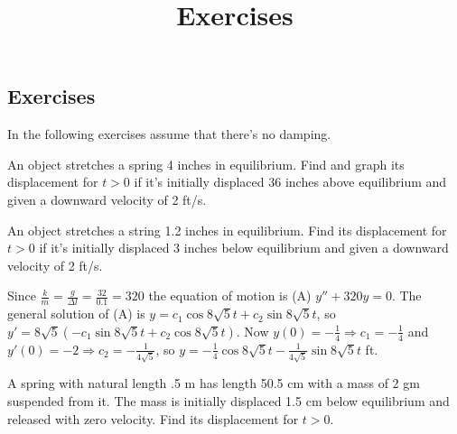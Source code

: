 \documentclass{ximera}
\title{Exercises} \license{CC BY-NC-SA 4.0}
\begin{document}
\begin{abstract}
\end{abstract}
\maketitle

\begin{onlineOnly}
\section*{Exercises}
\end{onlineOnly}

In the following exercises assume that there's no damping.

\begin{problem}\label{exer:6.1.1}
An object stretches a spring 4 inches in equilibrium.
Find and graph its displacement for $t>0$ if it's initially displaced
36 inches above equilibrium and given a downward velocity of 2 ft/s.
\end{problem}

\begin{problem}\label{exer:6.1.2}
An object  stretches a string 1.2 inches in equilibrium.
Find its displacement for $t>0$ if it's initially displaced 3 inches
below equilibrium and given a downward velocity of 2 ft/s.

\begin{solution}
    Since $\frac{k}{m}=\frac{g}{\Delta l}=\frac{32}{0.1}=320$ the
equation of motion is (A) $y''+320y=0$. The general solution of (A) is
$y=c_1\cos8\sqrt5t+c_2\sin8\sqrt5t$, so $y'=8\sqrt5(-c_1\sin8\sqrt5
t+c_2\cos8\sqrt5t)$. Now $y(0)=-\frac{1}{4}\Rightarrow
c_1=-\frac{1}{4}$ and $y'(0)=-2\Rightarrow
c_2=-\frac{1}{4\sqrt5}$, so $y=-\frac{1}{4}\cos8\sqrt{5}t-\frac{1}{4\sqrt{5}}\sin8\sqrt{5}t$ ft.
\end{solution}
\end{problem}

\begin{problem}\label{exer:6.1.3}
A spring with natural length .5 m has length 50.5 cm with a mass of 2
gm suspended from it. The mass is initially displaced 1.5 cm below
equilibrium and released with zero velocity. Find its displacement for
$t>0$.
\end{problem}
\end{document}
